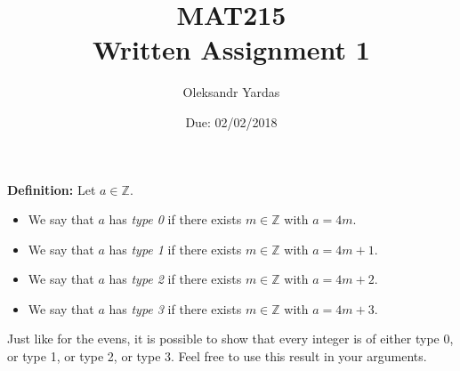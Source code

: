 \documentclass[12pt]{article}
\title{MAT215\\Written Assignment 1}
\author{Oleksandr Yardas}
\date{Due: 02/02/2018}
\begin{document}
\maketitle
\newpage
%
%
\noindent
{\bf Definition:}  Let $a \in \mathbb{Z}$.
\begin{itemize}
	\item We say that $a$ has {\em type 0} if there exists $m \in \mathbb{Z}$ with $a = 4m$.
	\item We say that $a$ has {\em type 1} if there exists $m \in \mathbb{Z}$ with $a = 4m+1$.
	\item We say that $a$ has {\em type 2} if there exists $m \in \mathbb{Z}$ with $a = 4m+2$.
	\item We say that $a$ has {\em type 3} if there exists $m \in \mathbb{Z}$ with $a = 4m+3$.
\end{itemize}
\noindent
Just like for the evens, it is possible to show that every integer is of either type 0, or type 1, or type 2, or type 3.  Feel free to use this result in your arguments.

\vspace{10pt}
\end{document}
